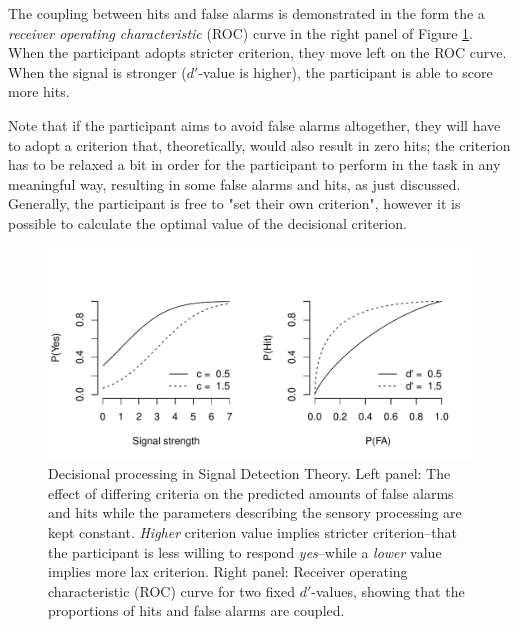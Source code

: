 \documentclass{article}\usepackage{knitr}
\begin{document}
The coupling between hits and false alarms is demonstrated in the form the a \textit{receiver operating characteristic} (ROC) curve \cite[161]{kingdomprins2010} in the right panel of Figure \ref{fig:critchange}. When the participant adopts stricter criterion, they move left on the ROC curve. When the signal is stronger ($d'$-value is higher), the participant is able to score more hits. 

Note that if the participant aims to avoid false alarms altogether, they will have to adopt a criterion that, theoretically, would also result in zero hits; the criterion has to be relaxed a bit in order for the participant to perform in the task in any meaningful way, resulting in some false alarms and hits, as just discussed. Generally, the participant is free to "set their own criterion", however it is possible to calculate the optimal value of the decisional criterion. 

\begin{figure}[!htb]
\begin{center}
\begin{knitrout}
\color{fgcolor}
\includegraphics[width=\maxwidth]{figure/unnamed-chunk-5-1} 

\end{knitrout}
\end{center}
\caption{ Decisional processing in Signal Detection Theory. Left panel: The effect of differing criteria on the predicted amounts of false alarms and hits while the parameters describing the sensory processing are kept constant. \textit{Higher} criterion value implies stricter criterion--that the participant is less willing to respond \textit{yes}--while a \textit{lower} value implies more lax criterion. Right panel: Receiver operating characteristic (ROC) curve for two fixed $d'$-values, showing that the proportions of hits and false alarms are coupled.}
\label{fig:critchange}
\end{figure}
\end{document}
